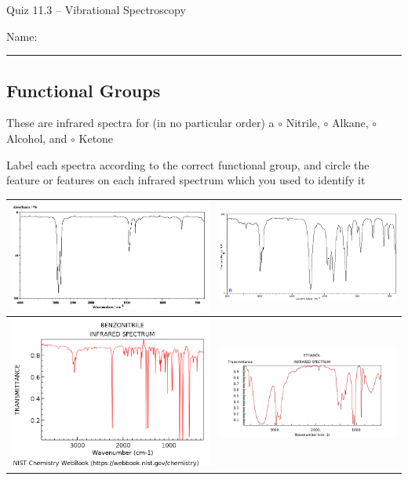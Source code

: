 \documentclass[11pt, letterpaper]{memoir}
\begin{document}
\begin{center}
	{\large Quiz 11.3 -- Vibrational Spectroscopy}
\end{center}
{\large Name: \rule[-1mm]{4in}{.1pt}

\subsection*{Functional Groups}
These are infrared spectra for (in no particular order) a $\circ$ Nitrile, $\circ$ Alkane, $\circ$ Alcohol, and $\circ$ Ketone

\noindent
Label each spectra according to the correct functional group, and circle the feature or features on each infrared spectrum which you used to identify it

\noindent
\begin{tabular}{c|c}
	\includegraphics[width=0.49\linewidth]{Alkane}                         & \includegraphics[width=0.49\linewidth]{Ketone}                           \\ \midrule
	\includegraphics[width=0.49\linewidth, trim = 0 0 0 40, clip]{Nitrile} & \includegraphics[width=0.49\linewidth, trim = 25 0 40 32, clip]{Alcohol}
\end{tabular}


}
\end{document}
